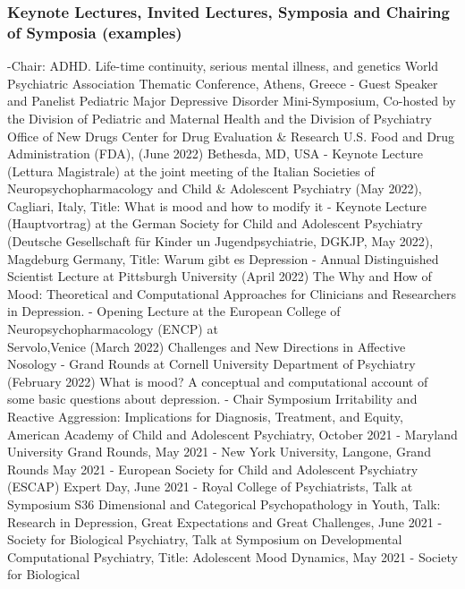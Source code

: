 \documentclass[
]{article}
\begin{document}
\hypertarget{keynote-lectures-invited-lectures-symposia-and-chairing-of-symposia-examples}{%
\subsubsection{Keynote Lectures, Invited Lectures, Symposia and Chairing
of Symposia
(examples)}\label{keynote-lectures-invited-lectures-symposia-and-chairing-of-symposia-examples}}

-Chair: ADHD. Life-time continuity, serious mental illness, and genetics
World Psychiatric Association Thematic Conference, Athens, Greece -
Guest Speaker and Panelist Pediatric Major Depressive Disorder
Mini-Symposium, Co-hosted by the Division of Pediatric and Maternal
Health and the Division of Psychiatry Office of New Drugs \textbar{}
Center for Drug Evaluation \& Research \textbar{} U.S. Food and Drug
Administration (FDA), (June 2022) Bethesda, MD, USA - Keynote Lecture
(Lettura Magistrale) at the joint meeting of the Italian Societies of
Neuropsychopharmacology and Child \& Adolescent Psychiatry (May 2022),
Cagliari, Italy, Title: What is mood and how to modify it - Keynote
Lecture (Hauptvortrag) at the German Society for Child and Adolescent
Psychiatry (Deutsche Gesellschaft für Kinder un Jugendpsychiatrie,
DGKJP, May 2022), Magdeburg Germany, Title: Warum gibt es Depression -
Annual Distinguished Scientist Lecture at Pittsburgh University (April
2022) The Why and How of Mood: Theoretical and Computational Approaches
for Clinicians and Researchers in Depression. - Opening Lecture at the
European College of Neuropsychopharmacology (ENCP) at\\
Servolo,Venice (March 2022) Challenges and New Directions in Affective
Nosology - Grand Rounds at Cornell University Department of Psychiatry
(February 2022) What is mood? A conceptual and computational account of
some basic questions about depression. - Chair Symposium Irritability
and Reactive Aggression: Implications for Diagnosis, Treatment, and
Equity, American Academy of Child and Adolescent Psychiatry, October
2021 - Maryland University Grand Rounds, May 2021 - New York University,
Langone, Grand Rounds May 2021 - European Society for Child and
Adolescent Psychiatry (ESCAP) Expert Day, June 2021 - Royal College of
Psychiatrists, Talk at Symposium S36 Dimensional and Categorical
Psychopathology in Youth, Talk: Research in Depression, Great
Expectations and Great Challenges, June 2021 - Society for Biological
Psychiatry, Talk at Symposium on Developmental Computational Psychiatry,
Title: Adolescent Mood Dynamics, May 2021 - Society for Biological
\end{document}
